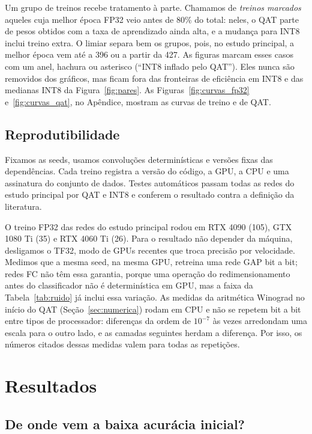 \documentclass[conference]{IEEEtran}
\begin{document}
Um grupo de treinos recebe tratamento à parte. Chamamos de \textit{treinos marcados} aqueles cuja melhor época FP32 veio antes de 80\%
do total: neles, o QAT parte de pesos obtidos com a taxa de aprendizado ainda alta, e a mudança para INT8 inclui treino extra. O limiar
separa bem os grupos, pois, no estudo principal, a melhor época vem até a 396 ou a partir da 427. As figuras marcam esses casos com um
anel, hachura ou asterisco (``INT8 inflado pelo QAT''). Eles nunca são removidos dos gráficos, mas ficam fora das fronteiras de
eficiência em INT8 e das medianas INT8 da Figura~\ref{fig:pares}. As Figuras~\ref{fig:curvas_fp32} e~\ref{fig:curvas_qat}, no Apêndice,
mostram as curvas de treino e de QAT.

\subsection{Reprodutibilidade}

Fixamos as seeds, usamos convoluções determinísticas e versões fixas das dependências. Cada treino registra a versão do código, a GPU, a CPU e uma assinatura do conjunto de dados. Testes automáticos passam todas as redes do estudo principal por QAT e
INT8 e conferem o resultado contra a definição da literatura.

O treino FP32 das redes do estudo principal rodou em RTX 4090 (105), GTX 1080 Ti (35) e RTX 4060 Ti (26). Para o resultado não depender
da máquina, desligamos o TF32, modo de GPUs recentes que troca precisão por velocidade. Medimos que a mesma seed, na mesma GPU, retreina
uma rede GAP bit a bit; redes FC não têm essa garantia, porque uma operação do redimensionamento antes do classificador não é
determinística em GPU, mas a faixa da Tabela~\ref{tab:ruido} já inclui essa variação. As medidas da aritmética Winograd no início do QAT
(Seção~\ref{sec:numerica}) rodam em CPU e não se repetem bit a bit entre tipos de processador: diferenças da ordem de $10^{-7}$ às vezes
arredondam uma escala para o outro lado, e as camadas seguintes herdam a diferença. Por isso, os números citados dessas medidas valem para
todas as repetições.

\section{Resultados}

\subsection{De onde vem a baixa acurácia inicial?}
\label{sec:geometria}
\end{document}
